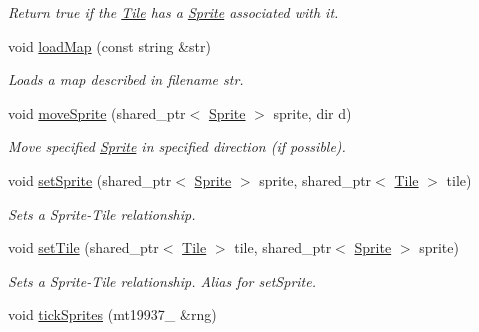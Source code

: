 \begin{DoxyCompactItemize}
\begin{DoxyCompactList}\small\item\em Return true if the \hyperlink{class_tile}{Tile} has a \hyperlink{class_sprite}{Sprite} associated with it. \end{DoxyCompactList}\item 
void \hyperlink{class_terr_af53f4fdf0e1605b1536bde8c3fb77c9d}{load\+Map} (const string \&str)\hypertarget{class_terr_af53f4fdf0e1605b1536bde8c3fb77c9d}{}\label{class_terr_af53f4fdf0e1605b1536bde8c3fb77c9d}

\begin{DoxyCompactList}\small\item\em Loads a map described in filename str. \end{DoxyCompactList}\item 
void \hyperlink{class_terr_aa0023b4af20266bb359b94dd21d96ff5}{move\+Sprite} (shared\+\_\+ptr$<$ \hyperlink{class_sprite}{Sprite} $>$ sprite, dir d)\hypertarget{class_terr_aa0023b4af20266bb359b94dd21d96ff5}{}\label{class_terr_aa0023b4af20266bb359b94dd21d96ff5}

\begin{DoxyCompactList}\small\item\em Move specified \hyperlink{class_sprite}{Sprite} in specified direction (if possible). \end{DoxyCompactList}\item 
void \hyperlink{class_terr_aaa2f0f8ba60f462070a0f7d40d1f4ed0}{set\+Sprite} (shared\+\_\+ptr$<$ \hyperlink{class_sprite}{Sprite} $>$ sprite, shared\+\_\+ptr$<$ \hyperlink{class_tile}{Tile} $>$ tile)\hypertarget{class_terr_aaa2f0f8ba60f462070a0f7d40d1f4ed0}{}\label{class_terr_aaa2f0f8ba60f462070a0f7d40d1f4ed0}

\begin{DoxyCompactList}\small\item\em Sets a Sprite-\/\+Tile relationship. \end{DoxyCompactList}\item 
void \hyperlink{class_terr_abd9bbf7cc0d7f0ef48a2198f5b2047ba}{set\+Tile} (shared\+\_\+ptr$<$ \hyperlink{class_tile}{Tile} $>$ tile, shared\+\_\+ptr$<$ \hyperlink{class_sprite}{Sprite} $>$ sprite)\hypertarget{class_terr_abd9bbf7cc0d7f0ef48a2198f5b2047ba}{}\label{class_terr_abd9bbf7cc0d7f0ef48a2198f5b2047ba}

\begin{DoxyCompactList}\small\item\em Sets a Sprite-\/\+Tile relationship. Alias for set\+Sprite. \end{DoxyCompactList}\item 
void \hyperlink{class_terr_ab9563f05a13abff25ab62d814dab743f}{tick\+Sprites} (mt19937\+\_ \&rng)\hypertarget{class_terr_ab9563f05a13abff25ab62d814dab743f}{}\label{class_terr_ab9563f05a13abff25ab62d814dab743f}


\end{DoxyCompactItemize}

